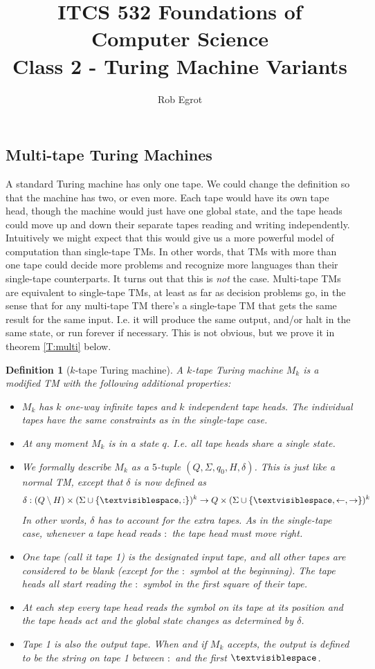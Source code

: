 \documentclass{article}
\title{ITCS 532 Foundations of Computer Science\\
Class 2 - Turing Machine Variants}
\author{Rob Egrot}
\date{}
\theoremstyle{plain}
\newtheorem{definition}[theorem]{Definition}{\bfseries}{\upshape}
\theoremstyle{definition}
\newcommand{\tvs}{\textvisiblespace}
\newcommand{\ra}{\rightarrow}
\newcommand{\la}{\leftarrow}
\begin{document}
\maketitle
\subsection{Multi-tape Turing Machines}
A standard Turing machine has only one tape. We could change the definition so that the machine has two, or even more. Each tape would have its own tape head, though the machine would just have one global state, and the tape heads could move up and down their separate tapes reading and writing independently. Intuitively we might expect that this would give us a more powerful model of computation than single-tape TMs. In other words, that TMs with more than one tape could decide more problems and recognize more languages than their single-tape counterparts. It turns out that this is \emph{not} the case. Multi-tape TMs are equivalent to single-tape TMs, at least as far as decision problems go, in the sense that for any multi-tape TM there's a single-tape TM that gets the same result for the same input. I.e. it will produce the same output, and/or halt in the same state, or run forever if necessary. This is not obvious, but we prove it in theorem \ref{T:multi} below.

\begin{definition}[$k$-tape Turing machine]
A $k$-tape Turing machine $M_k$ is a modified TM with the following additional properties:
\begin{itemize}
\item $M_k$ has $k$ one-way infinite tapes and $k$ independent tape heads. The individual tapes have the same constraints as in the single-tape case.
\item At any moment $M_k$ is in a state $q$. I.e. all tape heads share a single state.
\item We formally describe $M_k$ as a $5$-tuple $(Q,\Sigma,q_0,H,\delta)$. This is just like a normal TM, except that $\delta$ is now defined as 
\begin{equation*}\delta:(Q\setminus H)\times (\Sigma\cup\{\tvs,:\})^k\to Q\times (\Sigma\cup \{\tvs,\la,\ra\})^k\end{equation*}
In other words, $\delta$ has to account for the extra tapes. As in the single-tape case, whenever a tape head reads $:$ the tape head must move right.
\item One tape (call it tape 1) is the designated input tape, and all other tapes are considered to be blank (except for the $:$ symbol at the beginning). The tape heads all start reading the $:$ symbol in the first square of their tape.
\item At each step every tape head reads the symbol on its tape at its position and the tape heads act and the global state changes as determined by $\delta$.
\item Tape 1 is also the output tape. When and if $M_k$ accepts, the output is defined to be the string on tape 1 between $:$ and the first $\tvs$.
\end{itemize}
\end{definition}
\end{document}
